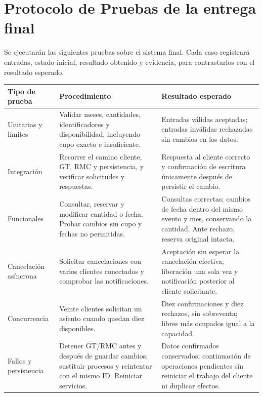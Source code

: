 \documentclass[10pt, a4paper]{article}
\begin{document}
	\section{Protocolo de Pruebas de la entrega final}
	\label{sec:protocol}
    Se ejecutarán las siguientes pruebas sobre el sistema final. Cada caso registrará entradas, estado inicial, resultado obtenido y evidencia, para contrastarlos con el resultado esperado.

    \begin{table}[H]
        \centering
        \footnotesize
        \renewcommand{\arraystretch}{1.15}
        \begin{tabular}{@{}p{}p{}p{}@{}}
            \toprule
            \textbf{Tipo de prueba} & \textbf{Procedimiento} & \textbf{Resultado esperado} \\
            \midrule
            Unitarias y límites & Validar meses, cantidades, identificadores y disponibilidad, incluyendo cupo exacto e insuficiente. & Entradas válidas aceptadas; entradas inválidas rechazadas sin cambios en los datos. \\
            Integración & Recorrer el camino cliente, GT, RMC y persistencia, y verificar solicitudes y respuestas. & Respuesta al cliente correcto y confirmación de escritura únicamente después de persistir el cambio. \\
            Funcionales & Consultar, reservar y modificar cantidad o fecha. Probar cambios sin cupo y fechas no permitidas. & Consultas correctas; cambios de fecha dentro del mismo evento y mes, conservando la cantidad. Ante rechazo, reserva original intacta. \\
            Cancelación asíncrona & Solicitar cancelaciones con varios clientes conectados y comprobar las notificaciones. & Aceptación sin esperar la cancelación efectiva; liberación una sola vez y notificación posterior al cliente solicitante. \\
            Concurrencia & Veinte clientes solicitan un asiento cuando quedan diez disponibles. & Diez confirmaciones y diez rechazos, sin sobreventa; libres más ocupados igual a la capacidad. \\
            Fallos y persistencia & Detener GT/RMC antes y después de guardar cambios; sustituir procesos y reintentar con el mismo ID. Reiniciar servicios. & Datos confirmados conservados; continuación de operaciones pendientes sin reiniciar el trabajo del cliente ni duplicar efectos. \\

\end{tabular}
\end{table}
\end{document}
